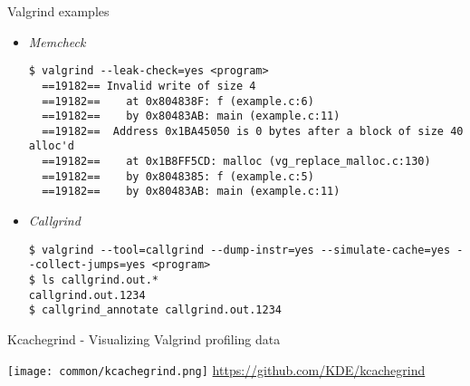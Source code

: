 \begin{frame}[fragile]{Valgrind examples}
  \begin{itemize}
  \item {\em Memcheck}
    \begin{block}{}
      {\tiny
\begin{verbatim}
$ valgrind --leak-check=yes <program>
  ==19182== Invalid write of size 4
  ==19182==    at 0x804838F: f (example.c:6)
  ==19182==    by 0x80483AB: main (example.c:11)
  ==19182==  Address 0x1BA45050 is 0 bytes after a block of size 40 alloc'd
  ==19182==    at 0x1B8FF5CD: malloc (vg_replace_malloc.c:130)
  ==19182==    by 0x8048385: f (example.c:5)
  ==19182==    by 0x80483AB: main (example.c:11)
\end{verbatim}
      }
    \end{block}

  \item {\em Callgrind}
    \begin{block}{}
      {\tiny
\begin{verbatim}
$ valgrind --tool=callgrind --dump-instr=yes --simulate-cache=yes --collect-jumps=yes <program>
$ ls callgrind.out.*
callgrind.out.1234
$ callgrind_annotate callgrind.out.1234
\end{verbatim}
      }
    \end{block}
  \end{itemize}
\end{frame}

\begin{frame}{Kcachegrind - Visualizing Valgrind profiling data}
  \begin{center}
    \texttt{[image: common/kcachegrind.png]}
    \url{https://github.com/KDE/kcachegrind}
  \end{center}
\end{frame}
